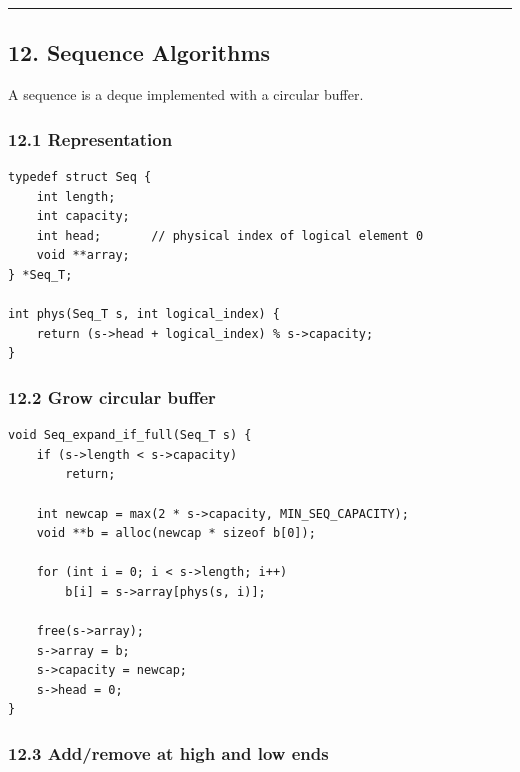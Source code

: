 \documentclass[11pt]{article}
\begin{document}
\begin{center}\rule{0.5\linewidth}{0.5pt}\end{center}

\subsection{12. Sequence Algorithms}\label{sequence-algorithms}

A sequence is a deque implemented with a circular buffer.

\subsubsection{12.1 Representation}\label{representation-4}

\begin{verbatim}
typedef struct Seq {
    int length;
    int capacity;
    int head;       // physical index of logical element 0
    void **array;
} *Seq_T;

int phys(Seq_T s, int logical_index) {
    return (s->head + logical_index) % s->capacity;
}
\end{verbatim}

\subsubsection{12.2 Grow circular buffer}\label{grow-circular-buffer}

\begin{verbatim}
void Seq_expand_if_full(Seq_T s) {
    if (s->length < s->capacity)
        return;

    int newcap = max(2 * s->capacity, MIN_SEQ_CAPACITY);
    void **b = alloc(newcap * sizeof b[0]);

    for (int i = 0; i < s->length; i++)
        b[i] = s->array[phys(s, i)];

    free(s->array);
    s->array = b;
    s->capacity = newcap;
    s->head = 0;
}
\end{verbatim}

\subsubsection{12.3 Add/remove at high and low ends}\label{addremove-at-high-and-low-ends}
\end{document}
